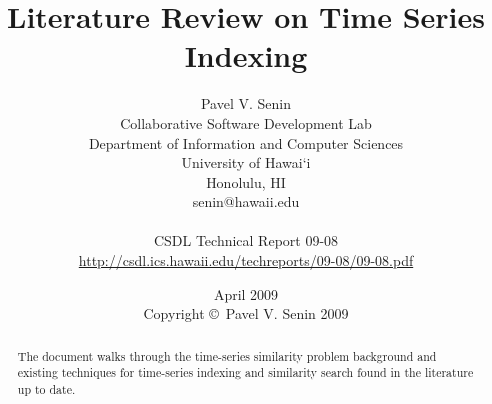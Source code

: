 \documentclass[11pt,oneside]{report}
\numberwithin{equation}{subsection}
\begin{document}
\title{Literature Review on Time Series Indexing}
\author{Pavel V. Senin \\
Collaborative Software Development Lab \\
Department of Information and Computer Sciences \\
University of Hawai`i \\
Honolulu, HI \\
senin@hawaii.edu \\
\\
CSDL Technical Report 09-08 \\
\url{http://csdl.ics.hawaii.edu/techreports/09-08/09-08.pdf}
}
\date{April 2009\\[3pt]
Copyright \copyright\ Pavel V. Senin 2009}

\maketitle

\tableofcontents

\begin{abstract}
The document walks through the time-series similarity problem background and existing techniques for time-series indexing and similarity search found in the literature up to date.
\end{abstract}


















%
%
\end{document}
